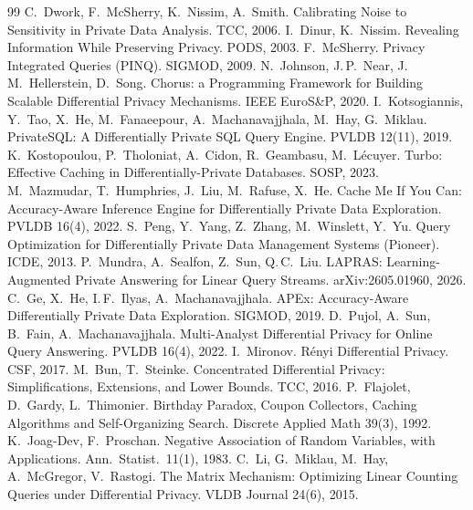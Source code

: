 \documentclass[runningheads]{llncs}
\begin{document}
\begin{thebibliography}{99}\small
{} C.\ Dwork, F.\ McSherry, K.\ Nissim, A.\ Smith. Calibrating Noise to Sensitivity in Private Data Analysis. TCC, 2006.
 I.\ Dinur, K.\ Nissim. Revealing Information While Preserving Privacy. PODS, 2003.
 F.\ McSherry. Privacy Integrated Queries (PINQ). SIGMOD, 2009.
 N.\ Johnson, J.\,P.\ Near, J.\,M.\ Hellerstein, D.\ Song. Chorus: a Programming Framework for Building Scalable Differential Privacy Mechanisms. IEEE EuroS\&P, 2020.
 I.\ Kotsogiannis, Y.\ Tao, X.\ He, M.\ Fanaeepour, A.\ Machanavajjhala, M.\ Hay, G.\ Miklau. PrivateSQL: A Differentially Private SQL Query Engine. PVLDB 12(11), 2019.
 K.\ Kostopoulou, P.\ Tholoniat, A.\ Cidon, R.\ Geambasu, M.\ L\'ecuyer. Turbo: Effective Caching in Differentially-Private Databases. SOSP, 2023.
 M.\ Mazmudar, T.\ Humphries, J.\ Liu, M.\ Rafuse, X.\ He. Cache Me If You Can: Accuracy-Aware Inference Engine for Differentially Private Data Exploration. PVLDB 16(4), 2022.
 S.\ Peng, Y.\ Yang, Z.\ Zhang, M.\ Winslett, Y.\ Yu. Query Optimization for Differentially Private Data Management Systems (Pioneer). ICDE, 2013.
 P.\ Mundra, A.\ Sealfon, Z.\ Sun, Q.\,C.\ Liu. LAPRAS: Learning-Augmented Private Answering for Linear Query Streams. arXiv:2605.01960, 2026.
 C.\ Ge, X.\ He, I.\,F.\ Ilyas, A.\ Machanavajjhala. APEx: Accuracy-Aware Differentially Private Data Exploration. SIGMOD, 2019.
 D.\ Pujol, A.\ Sun, B.\ Fain, A.\ Machanavajjhala. Multi-Analyst Differential Privacy for Online Query Answering. PVLDB 16(4), 2022.
 I.\ Mironov. R\'enyi Differential Privacy. CSF, 2017.
 M.\ Bun, T.\ Steinke. Concentrated Differential Privacy: Simplifications, Extensions, and Lower Bounds. TCC, 2016.
 P.\ Flajolet, D.\ Gardy, L.\ Thimonier. Birthday Paradox, Coupon Collectors, Caching Algorithms and Self-Organizing Search. Discrete Applied Math 39(3), 1992.
 K.\ Joag-Dev, F.\ Proschan. Negative Association of Random Variables, with Applications. Ann.\ Statist.\ 11(1), 1983.
 C.\ Li, G.\ Miklau, M.\ Hay, A.\ McGregor, V.\ Rastogi. The Matrix Mechanism: Optimizing Linear Counting Queries under Differential Privacy. VLDB Journal 24(6), 2015.

\end{thebibliography}
\end{document}
